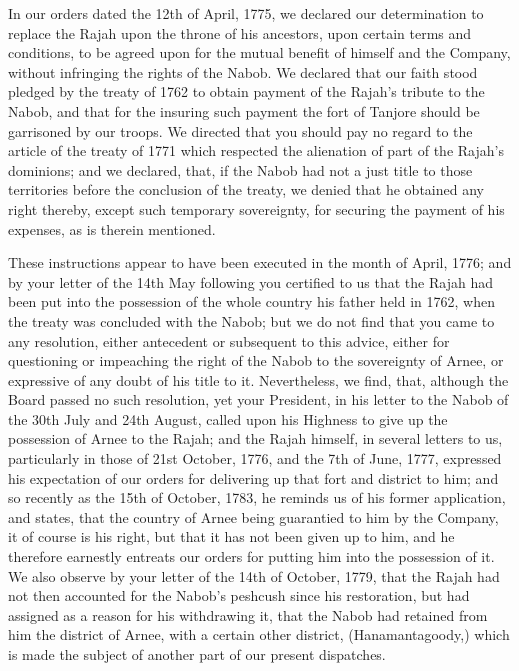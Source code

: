 In our orders dated the 12th of April, 1775, we declared our determination to replace the Rajah upon the throne of his ancestors, upon certain terms and conditions, to be agreed upon for the mutual benefit of himself and the Company, without infringing the rights of the Nabob. We declared that our faith stood pledged by the treaty of 1762 to obtain payment of the Rajah's tribute to the Nabob, and that for the insuring such payment the fort of Tanjore should be garrisoned by our troops. We directed that you should pay no regard to the article of the treaty of 1771 which respected the alienation of part of the Rajah's dominions; and we declared, that, if the Nabob had not a just title to those territories before the conclusion of the treaty, we denied that he obtained any right thereby, except such temporary sovereignty, for securing the payment of his expenses, as is therein mentioned.

These instructions appear to have been executed in the month of April, 1776; and by your letter of the 14th May following you certified to us that the Rajah had been put into the possession of the whole country his father held in 1762, when the treaty was concluded with the Nabob; but we do not find that you came to any resolution, either antecedent or subsequent to this advice, either for questioning or impeaching the right of the Nabob to the sovereignty of Arnee, or expressive of any doubt of his title to it. Nevertheless, we find, that, although the Board passed no such resolution, yet your President, in his letter to the Nabob of the 30th July and 24th August, called upon his Highness to give up the possession of Arnee to the Rajah; and the Rajah himself, in several letters to us, particularly in those of 21st October, 1776, and the 7th of June, 1777, expressed his expectation of our orders for delivering up that fort and district to him; and so recently as the 15th of October, 1783, he reminds us of his former application, and states, that the country of Arnee being guarantied to him by the Company, it of course is his right, but that it has not been given up to him, and he therefore earnestly entreats our orders for putting him into the possession of it. We also observe by your letter of the 14th of October, 1779, that the Rajah had not then accounted for the Nabob's peshcush since his restoration, but had assigned as a reason for his withdrawing it, that the Nabob had retained from him the district of Arnee, with a certain other district, (Hanamantagoody,) which is made the subject of another part of our present dispatches.

